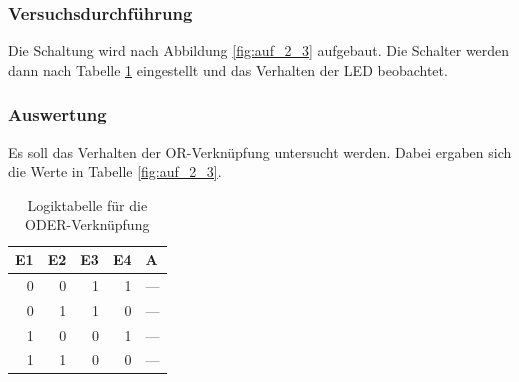 \documentclass[12pt,a4paper]{article}
\begin{document}
\subsubsection*{Versuchsdurchführung}

Die Schaltung wird nach Abbildung \ref{fig:auf_2_3} aufgebaut. Die Schalter werden dann nach Tabelle \ref{tab:2_3} eingestellt und das Verhalten der LED beobachtet.

\subsubsection*{Auswertung}

Es soll das Verhalten der OR-Verknüpfung untersucht werden. Dabei ergaben sich die Werte in Tabelle \ref{fig:auf_2_3}.

\begin{table}[H]
\begin{center}
\begin{tabular}{r|r|r|r|l}

\multicolumn{1}{l|}{E1} & \multicolumn{1}{l|}{E2} & \multicolumn{1}{l|}{E3} & \multicolumn{1}{l|}{E4} & A \\ \hline \hline
0 & 0 & 1 & 1 & --- \\ 
0 & 1 & 1 & 0 & --- \\ 
1 & 0 & 0 & 1 & --- \\ 
1 & 1 & 0 & 0 & --- \\ 
\end{tabular}
\end{center}
\caption{Logiktabelle für die ODER-Verknüpfung}
\label{tab:2_3}
\end{table}
\end{document}
